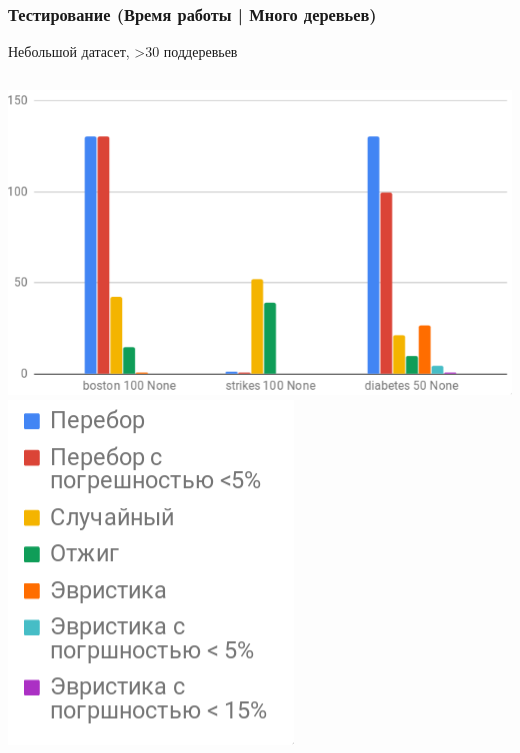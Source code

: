 \documentclass{beamer}
\begin{document}
\begin{frame} \frametitle{Тестирование (Время работы | Много деревьев)}
    Небольшой датасет, >30 поддеревьев
    \vfill
    \begin{columns}
        \includegraphics[width=\textwidth]{time_trees.png}
        \includegraphics[width=\textwidth]{time_legend.png}
    \end{columns}
\end{frame}
\end{document}
